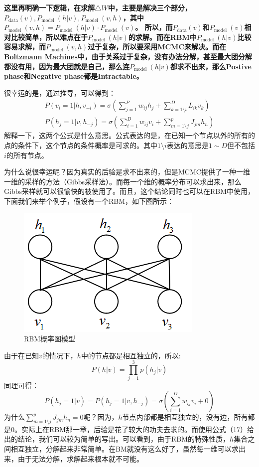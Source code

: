 \documentclass[a4paper]{article}
\begin{document}
\textbf{这里再明确一下逻辑，在求解$\triangle W$中，主要是解决三个部分，$P_{\text{data}} (v),P_{\text {model }}(h | v),P_{\text {model }}(v, h)$，其中$P_{\text {model }}(v, h) = P_{\text {model }}(h | v)\cdot P_{\text {model }}(v)$。 所以，而$P_{\text{data}} (v)$和$P_{\text {model }}(v)$相对比较简单，所以难点在于$P_{\text {model }}(h | v)$的求解。而在RBM中$P_{\text {model }}(h | v)$比较容易求解，而$P_{\text {model }}(v, h)$过于复杂，所以要采用MCMC来解决。而在Boltzmann Machines中，由于关系过于复杂，没有办法分解，甚至最大团分解都没有用，因为最大团就是自己，那么连$P_{\text {model }}(h | v)$都求不出来，那么Postive phase和Negative phase都是Intractable。}

很幸运的是，通过推导，可以得到：
\begin{equation}\begin{array}{l}
P\left(v_{i}=1 | h, v_{-i}\right)=\sigma\left(\sum_{j=1}^{P} w_{i j} h_{j}+\sum_{k=1\setminus i}^{D} L_{i k} v_{k}\right) \\
P\left(h_{j}=1 | v, h_{-j}\right)=\sigma\left(\sum_{i=1}^{D} w_{i j} v_{i}+\sum_{m=1\setminus j}^{p} J_{j m} h_{n}\right)
\end{array}\end{equation}
解释一下，这两个公式是什么意思。公式表达的是，在已知一个节点以外的所有的点的条件下，这个节点的条件概率是可求的。其中$1\setminus i$表达的意思是$1 \sim D$但不包括$i$的所有节点。

为什么说很幸运呢？因为真实的后验是求不出来的，但是MCMC提供了一种一维一维的采样的方法（Gibbs采样法）。而每一个维的概率分布可以求出来，那么Gibbs采样就可以很愉快的被使用了。而且，这个结论同时也可以在RBM中使用，下面我们来举个例子，假设有一个RBM，如下图所示：
\begin{figure}[H]
    \centering
    \includegraphics[width=.35\textwidth]{微信图片_20200414173610.png}
    \caption{RBM概率图模型}
    \label{fig:my_label_1}
\end{figure}
由于在已知$v$的情况下，$h$中的节点都是相互独立的，所以:
\begin{equation}P(h | v)=\prod_{j=1}^{3} p\left(h_{j} | v\right)\end{equation}
同理可得：
\begin{equation}P\left(h_{j} = 1| v\right)=P\left(h_{j} =1 | v, h_{-j}\right)=\sigma \left(\sum_{i=1}^{D} w_{ij} v_{i}+0\right)\end{equation}
为什么$\sum_{m=1\setminus j}^{p} J_{j m} h_{n} = 0$呢？因为，$h$节点内部都是相互独立的，没有边，所有都是0。实际上在RBM那一章，后验是花了较大的功夫去求的。而使用公式（17）给出的结论，我们可以较为简单的写出。可以看到，由于RBM的特殊性质，$h$集合之间相互独立，分解起来非常简单。在BM就没有这么好了，虽然每一维可以求出来，由于无法分解，求解起来根本就不可能。
\end{document}
